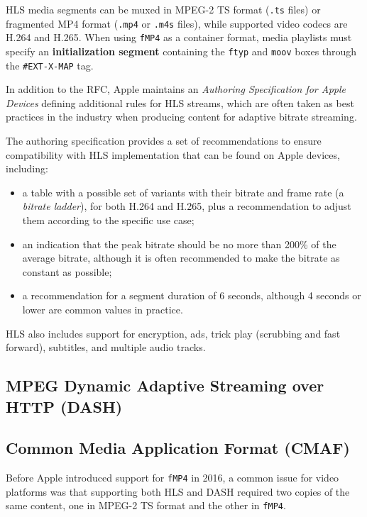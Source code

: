 HLS media segments can be muxed in MPEG-2 TS format (\texttt{.ts} files) or fragmented MP4 format (\texttt{.mp4} or \texttt{.m4s} files), while supported video codecs are H.264 and H.265. When using \texttt{fMP4} as a container format, media playlists must specify an \textbf{initialization segment} containing the \texttt{ftyp} and \texttt{moov} boxes through the \texttt{\#EXT-X-MAP} tag.

In addition to the RFC, Apple maintains an \textit{Authoring Specification for Apple Devices} defining additional rules for HLS streams, which are often taken as best practices in the industry when producing content for adaptive bitrate streaming.

The authoring specification provides a set of recommendations to ensure compatibility with HLS implementation that can be found on Apple devices, including:

\begin{itemize}
    \item a table with a possible set of variants with their bitrate and frame rate (a \textit{bitrate ladder}), for both H.264 and H.265, plus a recommendation to adjust them according to the specific use case;
    \item an indication that the peak bitrate should be no more than 200\% of the average bitrate, although it is often recommended to make the bitrate as constant as possible;\cite{ozer}
    \item a recommendation for a segment duration of 6 seconds, although 4 seconds or lower are common values in practice.\cite{ozer}
\end{itemize}

HLS also includes support for encryption, ads, trick play (scrubbing and fast forward), subtitles, and multiple audio tracks.


\subsection{MPEG Dynamic Adaptive Streaming over HTTP (DASH)}
\label{sec:bg/technologies/dash}


\subsection{Common Media Application Format (CMAF)}
\label{sec:bg/technologies/cmaf}

Before Apple introduced support for \texttt{fMP4} in 2016, a common issue for video platforms was that supporting both HLS and DASH required two copies of the same content, one in MPEG-2 TS format and the other in \texttt{fMP4}.

